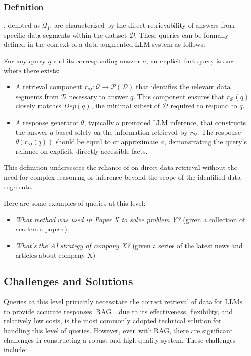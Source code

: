 \subsubsection{Definition}
\MFUsentencecase{\firstlevel}, denoted as \(\mathcal{Q}_1\), are characterized by the direct retrievability of answers from specific data segments within the dataset \(\mathcal{D}\). These queries can be formally defined in the context of a data-augmented LLM system as follows:

For any query \( q \) and its corresponding answer \( a \), an explicit fact query is one where there exists:
\begin{itemize}
    \item A retrieval component \( r_{\mathcal{D}}: \mathcal{Q} \rightarrow \mathcal{P}(\mathcal{D}) \) that identifies the relevant data segments from \(\mathcal{D}\) necessary to answer \( q \). This component ensures that \( r_{\mathcal{D}}(q) \) closely matches \( Dep(q) \), the minimal subset of \(\mathcal{D}\) required to respond to \( q \).
    \item A response generator \( \theta \), typically a prompted LLM inference, that constructs the answer \( a \) based solely on the information retrieved by \( r_{\mathcal{D}} \). The response \( \theta(r_{\mathcal{D}}(q)) \) should be equal to or approximate \( a \), demonstrating the query's reliance on explicit, directly accessible facts.
\end{itemize}
This definition underscores the reliance of \firstlevel on direct data retrieval without the need for complex reasoning or inference beyond the scope of the identified data segments.

Here are some examples of queries at this level:
\begin{itemize}
    \item \textit{What method was used in Paper X to solve problem Y?} (given a collection of academic papers)
    \item \textit{What's the AI strategy of company X?} (given a series of the latest news and articles about company X)
\end{itemize}

\subsection{Challenges and Solutions}
Queries at this level primarily necessitate the correct retrieval of data for LLMs to provide accurate responses. RAG~\cite{rag_survey_23_1}, due to its effectiveness, flexibility, and relatively low costs, is the most commonly adopted technical solution for handling this level of queries. However, even with RAG, there are significant challenges in constructing a robust and high-quality system. These challenges include:


